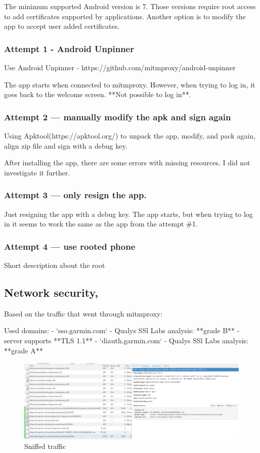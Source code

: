 The minimum supported Android version is 7.
Those versions require root access to add certificates supported by applications.
Another option is to modify the app to accept user added certificates.

\subsubsection*{Attempt 1 - Android Unpinner}
Use Android Unpinner - https://github.com/mitmproxy/android-unpinner

The app starts when connected to mitmproxy.
However, when trying to log in, it goes back to the welcome screen.
**Not possible to log in**.

\subsubsection*{Attempt 2 — manually modify the apk and sign again}

Using Apktool(https://apktool.org/) to unpack the app, modify, and pack again, align zip file and sign with a debug key.

After installing the app, there are some errors with missing resources.
I did not investigate it further.

\subsubsection*{Attempt 3 — only resign the app.}
Just resigning the app with a debug key.
The app starts, but when trying to log in it seems to work the same as the app from the attempt \#1.

\subsubsection*{Attempt 4 — use rooted phone}
Short description about the root

\subsection{Network security,}
Based on the traffic that went through mitmproxy:

Used domains:
- `sso.garmin.com` - Qualys SSl Labs analysis: **grade B**
- server supports **TLS 1.1**
- `diauth.garmin.com` - Qualys SSl Labs analysis: **grade A**

\begin{figure}[h]
    \centering
    \includegraphics[width=1\linewidth]{../../images/mitmproxy unpinner}
    \caption{Sniffed traffic}
    \label{fig:mitmproxy-unpinner}
\end{figure}

